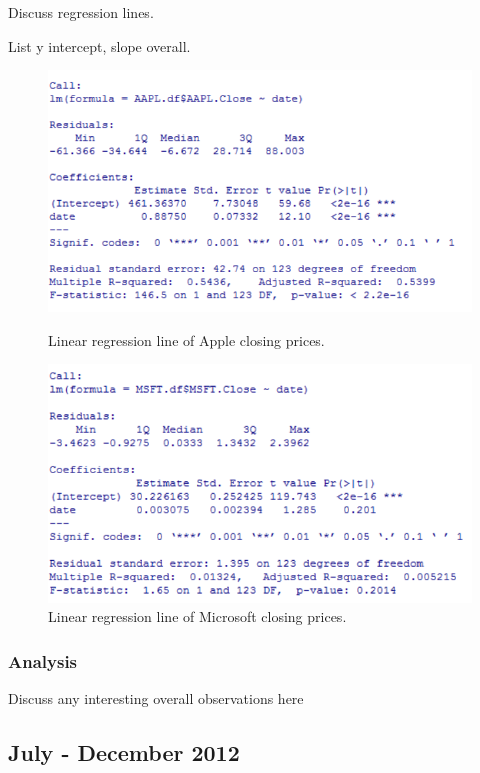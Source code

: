 \documentclass[paper=a4, fontsize=11pt]{scrartcl} %
\numberwithin{equation}{section} %
\numberwithin{figure}{section} %
\numberwithin{table}{section} %
\begin{document}
Discuss regression lines. 

List y intercept, slope overall. 

\begin{figure}[!htb]
  \includegraphics[width=\linewidth]{graph/aapl_reg_3.png}
  \caption{Linear regression line of Apple closing prices.}
\endminipage\hfill
{}
  \includegraphics[width=\linewidth]{graph/msft_reg_3.png}
  \caption{Linear regression line of Microsoft closing prices.}
\endminipage\hfill
\end{figure}



\subsubsection{Analysis}
Discuss any interesting overall observations here

\subsection{July - December  2012 }
\end{document}
